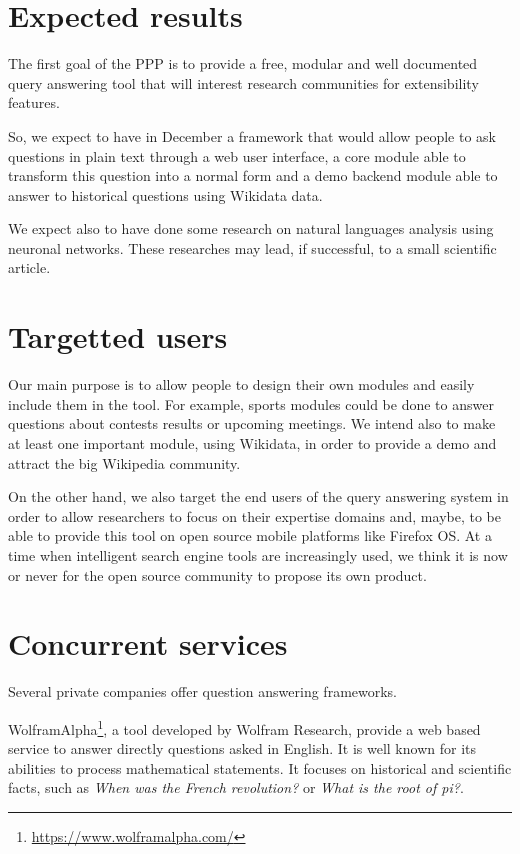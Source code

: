 \documentclass[a4paper,10pt]{article}
\begin{document}
\section{Expected results}
The first goal of the PPP is to provide a free, modular and well documented
query answering tool that will interest research communities for extensibility features. 

So, we expect to have in December a framework that would allow people to ask
questions in plain text through a web user interface, a core module able to transform
this question into a normal form and a demo backend module able to answer
to historical questions using Wikidata data.

We expect also to have done some research on natural languages analysis using
neuronal networks. These researches may lead, if successful, to
a small scientific article.

\section{Targetted users}

Our main purpose is to allow people to design their own modules and
easily include them in the tool. For example, sports modules could be done to answer questions about contests results or 
upcoming meetings.  We intend also to make at least one important module, using Wikidata, in order to provide a demo
and attract the big Wikipedia community. 

On the other hand, we also target the end users of the query answering system in order to allow researchers to focus on
their expertise domains and, maybe, to be able to provide this tool on open source mobile platforms like Firefox OS. At a
time when intelligent search engine tools are increasingly used, we think it is now or never for the open source community
to propose its own product.

\section{Concurrent services}

Several private companies offer question answering frameworks. 

WolframAlpha\footnote{\url{https://www.wolframalpha.com/}}, a tool developed by 
Wolfram Research, provide a web based service to answer directly questions asked
in English. It is well known for its abilities to process mathematical statements.
It focuses on historical and scientific facts, such as \emph{When was the French 
revolution?} or \emph{What is the root of pi?}.
\end{document}
